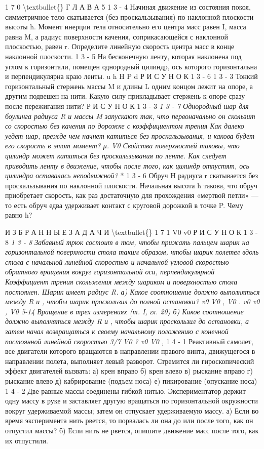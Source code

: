 \documentclass[10pt,oneside]{article}
\begin{document}
1 7 0 \textbackslash{}textbullet\{\} Г Л А В А  5 \emph{ } 1 3 - 4 Начиная движение из состояния покоя, симметричное тело скатывается (без проскальзывания) по наклонной плоскости высоты h. Момент инерции тела относительно его центра масс равен I, масса равна M, а радиус поверхности качения, соприкасающейся с наклонной плоскостью, равен r. Определите линейную скорость центра масс в конце наклонной плоскости. \emph{ } 1 3 - 5 На бесконечную ленту, которая наклонена под углом к горизонтали, помещен однородный цилиндр, ось которого горизонтальна и перпендикулярна краю ленты. u h H P d Р И С У Н О К  1 3 - 6 \emph{ } 1 3 - 3 Тонкий горизонтальный стержень массы M и длины L одним концом лежит на опоре, а другим подвешен на нити. Какую силу прикладывает стержень к опоре сразу после пережигания нити? Р И С У Н О К  1 3 - 3 \emph{ } \emph{ 1 3 - 7 Однородный шар для боулинга радиуса R и массы M запускают так, что первоначально он скользит со скоростью без качения по дорожке с коэффициентом трения Как далеко уедет шар, прежде чем начнет катиться без проскальзывания, и какова будет его скорость в этот момент? μ. V0 Свойства поверхностей таковы, что цилиндр может катиться без проскальзывания по ленте. Как следует приводить ленту в движение, чтобы после того, как цилиндр отпустят, ось цилиндра оставалась неподвижной? } * 1 3 - 6 Обруч H радиуса r скатывается без проскальзывания по наклонной плоскости. Начальная высота h такова, что обруч приобретает скорость, как раз достаточную для прохождения «мертвой петли» --- то есть обруч едва удерживает контакт с круговой дорожкой в точке P. Чему равно h?\par

И З Б Р А Н Н Ы Е  З А Д А Ч И \textbackslash{}textbullet\{\} 1 7 1 V0 v0 Р И С У Н О К  1 3 - 8 \emph{ } \emph{ 1 3 - 8 Забавный трюк состоит в том, чтобы прижать пальцем шарик на горизонтальной поверхности стола таким образом, чтобы шарик полетел вдоль стола с начальной линейной скоростью и начальной угловой скоростью обратного вращения вокруг горизонтальной оси, перпендикулярной Коэффициент трения скольжения между шариком и поверхностью стола постоянен. Шарик имеет радиус R. а) Какое соотношение должно выполняться между R и , чтобы шарик проскользил до полной остановки? v0 V0 , V0 . v0 v0 , V0 5-14 Вращение в трех измерениях (т. I, гл. 20) б) Какое соотношение должно выполняться между R и , чтобы шарик проскользил до остановки, а затем начал возвращаться к своему начальному положению с конечной постоянной линейной скоростью 3/7 V0 ? v0 V0 , } 1 4 - 1 Реактивный самолет, все двигатели которого вращаются в направлении правого винта, движущегося в направлении полета, выполняет левый разворот. Стремится ли гироскопический эффект двигателей вызвать: а) крен вправо б) крен влево в) рыскание вправо г) рыскание влево д) кабрирование (подъем носа) е) пикирование (опускание носа) \emph{ } 1 4 - 2 Две равные массы соединены гибкой нитью. Экспериментатор держит одну массу в руке и заставляет другую вращаться по горизонтальной окружности вокруг удерживаемой массы; затем он отпускает удерживаемую массу. а) Если во время эксперимента нить рвется, то порвалась ли она до или после того, как он отпустил массы? б) Если нить не рвется, опишите движение масс после того, как их отпустили.\par
\end{document}
